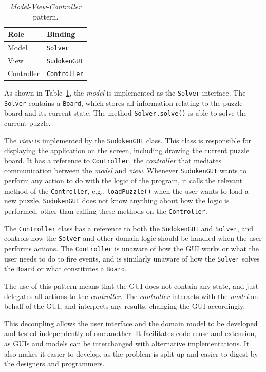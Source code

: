 \documentclass[a4paper, 11pt]{article}
\begin{document}
\begin{table}[h!]
\centering
\begin{tabular}{l l}
\textbf{Role} & \textbf{Binding} \\ \hline
Model         & \texttt{Solver} \\
View          & \texttt{SudokenGUI} \\
Controller    & \texttt{Controller} \\
\end{tabular}
\caption{\textit{Model-View-Controller} pattern.}
\label{table:mvc}
\end{table}

As shown in Table~\ref{table:mvc}, the \textit{model} is implemented as the \texttt{Solver} interface. The \texttt{Solver} contains a \texttt{Board}, which stores all information relating to the puzzle board and its current state. The method \texttt{Solver.solve()} is able to solve the current puzzle.

The \textit{view} is implemented by the \texttt{SudokenGUI} class. This class is responsible for displaying the application on the screen, including drawing the current puzzle board. It has a reference to \texttt{Controller}, the \textit{controller} that mediates communication between the \textit{model} and \textit{view}. Whenever \texttt{SudokenGUI} wants to perform any action to do with the logic of the program, it calls the relevant method of the \texttt{Controller}, e.g., \texttt{loadPuzzle()} when the user wants to load a new puzzle. \texttt{SudokenGUI} does not know anything about how the logic is performed, other than calling these methods on the \texttt{Controller}.

The \texttt{Controller} class has a reference to both the \texttt{SudokenGUI} and \texttt{Solver}, and controls how the \texttt{Solver} and other domain logic should be handled when the user performs actions. The \texttt{Controller} is unaware of how the GUI works or what the user needs to do to fire events, and is similarly unaware of how the \texttt{Solver} solves the \texttt{Board} or what constitutes a \texttt{Board}.

The use of this pattern means that the GUI does not contain any state, and just delegates all actions to the \textit{controller}. The \textit{controller} interacts with the \textit{model} on behalf of the GUI, and interprets any results, changing the GUI accordingly.

This decoupling allows the user interface and the domain model to be developed and tested independently of one another. It facilitates code reuse and extension, as GUIs and models can be interchanged with alternative implementations. It also makes it easier to develop, as the problem is split up and easier to digest by the designers and programmers.
\end{document}
